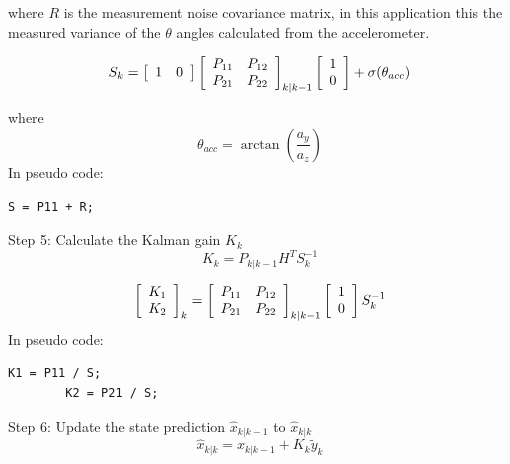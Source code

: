 \documentclass[a4paper]{report}
\begin{document}
		where $R$ is the measurement noise covariance matrix, in this application this the measured variance of the $\theta$ angles calculated from the accelerometer.

		\begin{equation}
		S_{k}=
		\left[
		\begin{array}{c c}
		1	&	0
		\end{array} \right]
		\left[
		\begin{array}{c c}
		P_{11}	&	P_{12}\\
		P_{21}	&	P_{22}
		\end{array} \right]_{k|k-1}
		\left[
		\begin{array}{c}
		1\\
		0
		\end{array} \right]
		+ \sigma(\theta_{acc})
		\end{equation}

		where
		\begin{equation*}
		\theta_{acc}=\arctan{\left(\frac{a_{y}}{a_{z}}\right)}
		 \end{equation*}
    In pseudo code:
		\begin{lstlisting}[frame=single]
		S = P11 + R;
		\end{lstlisting}
		Step 5: Calculate the Kalman gain $K_{k}$
		\begin{equation}
		K_{k}=P_{k|k-1}H^{T}S^{-1}_{k}
		\end{equation}

		\begin{equation}
		\left[
		\begin{array}{c}
		K_{1}\\
		K_{2}
		\end{array} \right]_{k}
		=
		\left[
		\begin{array}{c c}
		P_{11}	&	P_{12}\\
		P_{21}	&	P_{22}
		\end{array}  \right]_{k|k-1}
		\left[
		\begin{array}{c}
		1\\
		0
		\end{array} \right]
		S^{-1}_{k}
		\end{equation}
    In pseudo code:
		\begin{lstlisting}[frame=single]
		K1 = P11 / S;
		K2 = P21 / S;
		\end{lstlisting}
		Step 6: Update the state prediction $\hat{x}_{k|k-1}$ to  $\hat{x}_{k|k}$
		\begin{equation}
		\hat{x}_{k|k}=\hat{x}_{k|k-1}+K_{k}\tilde{y}_{k}
		\end{equation}
\end{document}
